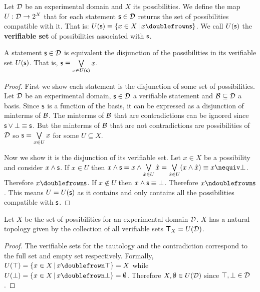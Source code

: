 \documentclass[11pt,letterpaper,fleqn]{memoir} %
\begin{document}
\begin{mathSection}
	
\begin{defn}
	Let $\mathcal{D}$ be an experimental domain and $X$ its possibilities. We define the map $U : \mathcal{D} \rightarrow 2^X$ that for each statement $\mathsf{s} \in \mathcal{D}$ returns the set of possibilities compatible with it. That is: $U(\obs)\equiv\{ x \in X \, | \, x \comp \obs\}$. We call $U(\mathsf{s})$ the \textbf{verifiable set} of possibilities associated with $\mathsf{s}$.
\end{defn}

\begin{prop}
	A statement $\mathsf{s} \in \mathcal{D}$ is equivalent the disjunction of the possibilities in its verifiable set $U(\mathsf{s})$. That is, $\mathsf{s} \equiv \bigvee\limits_{x \in U(\mathsf{s})} x$.
\end{prop}
\begin{proof}
	First we show each statement is the disjunction of some set of possibilities. Let $\mathcal{D}$ be an experimental domain, $\mathsf{s} \in \mathcal{D}$ a verifiable statement and $\mathcal{B} \subseteq \mathcal{D}$ a basis. Since $\mathsf{s}$ is a function of the basis, it can be expressed as a disjunction of minterms of $\mathcal{B}$. The minterms of $\mathcal{B}$ that are contradictions can be ignored since $\mathsf{s} \vee \bot \equiv \mathsf{s}$. But the minterms of $\mathcal{B}$ that are not contradictions are possibilities of $\mathcal{D}$ so $\mathsf{s}=\bigvee\limits_{x \in U} x$ for some $U \subseteq X$.
	
	Now we show it is the disjunction of its verifiable set. Let $x \in X$ be a possibility and consider $x \wedge \mathsf{s}$. If $x\in U$ then $x \AND \obs = x \AND \bigOR\limits_{\hat{x} \in U} \hat{x} = \bigOR\limits_{\hat{x} \in U} ( x \AND \hat{x}) \equiv x \nequiv \contradiction$. Therefore $x \comp \obs$. If $x \notin U$ then $x \wedge \mathsf{s} \equiv \bot$. Therefore $x \ncomp \obs$. This means $U=U(\mathsf{s})$ as it contains and only contains all the possibilities compatible with $\mathsf{s}$.
\end{proof}

\begin{prop}
	Let $X$ be the set of possibilities for an experimental domain $\mathcal{D}$. $X$ has a natural topology given by the collection of all verifiable sets $\mathsf{T}_X=U(\mathcal{D})$.
\end{prop}

\begin{proof}
	The verifiable sets for the tautology and the contradiction correspond to the full set and empty set respectively. Formally, $U(\tautology) = \{ x \in X \, | \, x \comp \tautology\} = X$ while $U(\contradiction) = \{ x \in X \, | \, x \comp \contradiction\} = \emptyset$. Therefore $X, \emptyset \in U(\mathcal{D})$ since $\top, \bot \in \mathcal{D}$.


\end{proof}
\end{mathSection}
\end{document}
